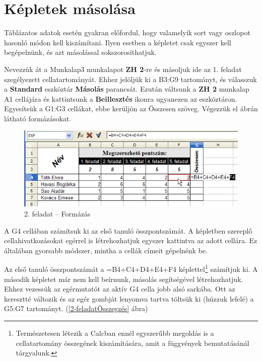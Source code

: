 \section{Képletek másolása}

Táblázatos adatok esetén gyakran előfordul, hogy valamelyik
sort vagy oszlopot hasonló módon kell kiszámítani. Ilyen
esetben a képletet csak egyszer kell begépelnünk, és azt
másolással sokszorosíthatjuk.

Nevezzük át a Munkalap3 munkalapot \textbf{ZH 2}-re és
másoljuk ide az 1. feladat szegélyezett cellatartományát. Ehhez
jelöljük ki a B3:G9 tartományt, és válasszuk a
\textbf{Standard} eszköztár \textbf{Másolás} parancsát.
Ezután váltsunk a  \textbf{ZH 2} munkalap A1 cellájára és
kattintsunk a \textbf{Beillesztés} ikonra ugyanezen az
eszköztáron. Egyesítsük a G1:G3 cellákat, ebbe kerüljön
az Összesen szöveg. Végezzük el  ábrán látható
formázásokat.

\begin{figure}[!h]
\begin{center}
\includegraphics[width=14.238cm]{oocalcv2-img23.png}
\caption{2. feladat --  Formázás}\label{2-feladatFormázás}
\end{center}
\end{figure}

A G4 cellában számítsuk ki az első tanuló
összpontszámát. A képletben szereplő cellahivatkozásokat
egérrel is létrehozhatjuk egyszer kattintva az adott cellára. Ez
általában gyorsabb módszer, mintha a cellák címeit
gépelnénk be.

Az első tanuló összpontszámát a =B4+C4+D4+E4+F4
képlettel\footnote{Természetesen létezik a Calcban ennél
egyszerűbb megoldás is a cellatartomány összegének
kiszámítására, amit a  függvények bemutatásánál
tárgyalunk.} számítjuk ki. A második  képletet már nem
kell beírnunk, másolás segítségével létrehozhatjuk. Ehhez
vezessük az egérmutatót az aktív G4 cella jobb alsó
sarkába. Ott az keresztté változik és az egér gombját
lenyomva tartva töltsük ki (húzzuk lefelé) a G5:G7
tartományt. (\ref{2-feladatÖsszegzés} ábra)

